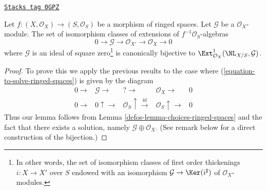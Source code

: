 \begin{lemma}
\label{defos-lemma-extensions-of-relative-ringed-spaces}
\href{https://stacks.math.columbia.edu/tag/0GPZ}{\texttt{Stacks tag 0GPZ}}

Let $f : (X, \mathcal{O}_X) \to (S, \mathcal{O}_S)$ be a morphism of
ringed spaces. Let $\mathcal{G}$ be a $\mathcal{O}_X$-module.
The set of isomorphism classes of extensions of
$f^{-1}\mathcal{O}_S$-algebras
$$
0 \to \mathcal{G} \to \mathcal{O}_{X'} \to \mathcal{O}_X \to 0
$$
where $\mathcal{G}$ is an ideal of square zero\footnote{In other words,
the set of isomorphism classes of first order thickenings
$i : X \to X'$ over $S$ endowed with an isomorphism
$\mathcal{G} \to \Ker(i^\sharp)$ of $\mathcal{O}_X$-modules.}
is canonically bijective to
$\Ext^1_{\mathcal{O}_X}(\NL_{X/S}, \mathcal{G})$.
\end{lemma}

\begin{proof}

To prove this we apply the previous results to the case where
(\ref{equation-to-solve-ringed-spaces}) is given by the diagram
$$
\begin{array}{ccccc}0 \longrightarrow & \mathcal{G} \longrightarrow & {?} \longrightarrow & \mathcal{O}_X \longrightarrow & 0 \\ 0 \longrightarrow & 0 \uparrow\longrightarrow & \mathcal{O}_S \uparrow\overset{\text{id}}{\longrightarrow} & \mathcal{O}_S \uparrow\longrightarrow & 0\end{array}
$$
Thus our lemma follows from Lemma \ref{defos-lemma-choices-ringed-spaces}
and the fact that there exists a solution, namely
$\mathcal{G} \oplus \mathcal{O}_X$.
(See remark below for a direct construction of the bijection.)
\end{proof}

